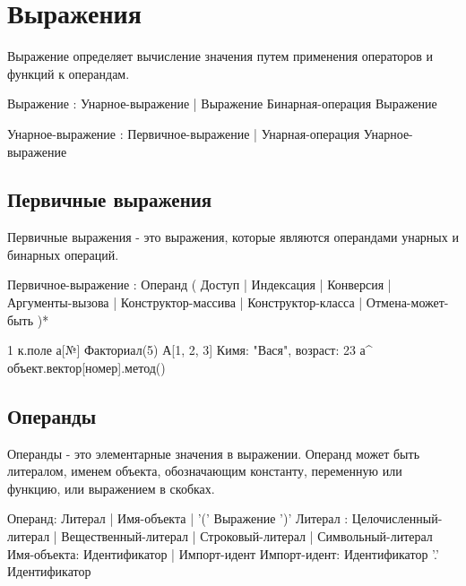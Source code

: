 \hypertarget{expressions}{%
\section{Выражения}\label{expr:chapter}}

Выражение определяет вычисление значения путем применения операторов и функций к операндам. 

\begin{Grammar}
Выражение
    : Унарное-выражение
	| Выражение Бинарная-операция Выражение

Унарное-выражение
	: Первичное-выражение
	| Унарная-операция Унарное-выражение
\end{Grammar}    

\hypertarget{primary-expr}{%
\subsection{Первичные выражения}\label{expr:primary-expr}}

Первичные выражения - это выражения, которые являются операндами унарных и бинарных операций.

\begin{Grammar}
Первичное-выражение
    : Операнд
	( Доступ
	| Индексация
	| Конверсия
	| Аргументы-вызова
	| Конструктор-массива
	| Конструктор-класса
	| Отмена-может-быть
	)*
\end{Grammar}    

\begin{Trivil}
1
к.поле
а[№]
Факториал(5)
А[1, 2, 3]
К{имя: "Вася", возраст: 23}
а^
объект.вектор[номер].метод()
\end{Trivil}

\hypertarget{operands}{%
\subsection{Операнды}\label{expr:operands}}

Операнды - это элементарные значения в выражении. Операнд может быть литералом, именем объекта, 
обозначающим константу, переменную или функцию, или выражением в скобках.

\begin{Grammar}
Операнд: Литерал | Имя-объекта | '(' Выражение ')'
Литерал
    : Целочисленный-литерал
    | Вещественный-литерал
    | Строковый-литерал
    | Символьный-литерал
Имя-объекта: Идентификатор | Импорт-идент
Импорт-идент: Идентификатор '.' Идентификатор
\end{Grammar}    

